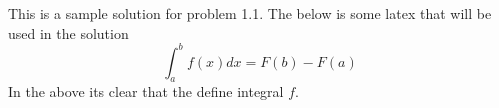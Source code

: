 This is a sample solution for problem 1.1. The below is some latex that
will be used in the solution \[\int_{a}^b f(x) dx = F(b) - F(a)\] In the
above its clear that the define integral \(f\).
